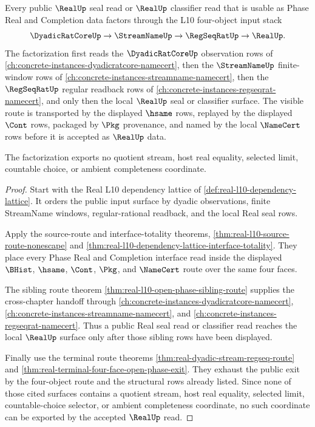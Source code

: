 \begin{theorem}
\label{thm:realup-l10-input-factorization}
Every public $\RealUp$ seal read or $\RealUp$ classifier read that is usable as Phase Real and Completion data factors through the L10 four-object input stack
$$
\DyadicRatCoreUp \to \StreamNameUp \to \RegSeqRatUp \to \RealUp .
$$
The factorization first reads the $\DyadicRatCoreUp$ observation rows of \autoref{ch:concrete-instances-dyadicratcore-namecert}, then the $\StreamNameUp$ finite-window rows of \autoref{ch:concrete-instances-streamname-namecert}, then the $\RegSeqRatUp$ regular readback rows of \autoref{ch:concrete-instances-regseqrat-namecert}, and only then the local $\RealUp$ seal or classifier surface. The visible route is transported by the displayed $\hsame$ rows, replayed by the displayed $\Cont$ rows, packaged by $\Pkg$ provenance, and named by the local $\NameCert$ rows before it is accepted as $\RealUp$ data.

The factorization exports no quotient stream, host real equality, selected limit, countable choice, or ambient completeness coordinate.
\end{theorem}
\begin{proof}
Start with the Real L10 dependency lattice of \autoref{def:real-l10-dependency-lattice}. It orders the public input surface by dyadic observations, finite StreamName windows, regular-rational readback, and the local Real seal rows.

Apply the source-route and interface-totality theorems, \autoref{thm:real-l10-source-route-nonescape} and \autoref{thm:real-l10-dependency-lattice-interface-totality}. They place every Phase Real and Completion interface read inside the displayed $\BHist$, $\hsame$, $\Cont$, $\Pkg$, and $\NameCert$ route over the same four faces.

The sibling route theorem \autoref{thm:real-l10-open-phase-sibling-route} supplies the cross-chapter handoff through \autoref{ch:concrete-instances-dyadicratcore-namecert}, \autoref{ch:concrete-instances-streamname-namecert}, and \autoref{ch:concrete-instances-regseqrat-namecert}. Thus a public Real seal read or classifier read reaches the local $\RealUp$ surface only after those sibling rows have been displayed.

Finally use the terminal route theorems \autoref{thm:real-dyadic-stream-regseq-route} and \autoref{thm:real-terminal-four-face-open-phase-exit}. They exhaust the public exit by the four-object route and the structural rows already listed. Since none of those cited surfaces contains a quotient stream, host real equality, selected limit, countable-choice selector, or ambient completeness coordinate, no such coordinate can be exported by the accepted $\RealUp$ read.
\end{proof}

